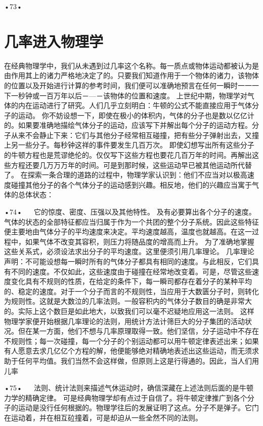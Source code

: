 •73•
  
\section{几率进入物理学}

在经典物理学中，我们从未遇到过几率这个名称。每一质点或物体运动都被认为是由作用其上的诸力严格地决定了的。只要我们知道作用于一个物体的诸力，该物体的位置以及开始进行计算的参考时间，我们便可以准确地预言在任何一瞬时一一一下一秒钟或一百万年以后－—－该物体的位置和速度。
上世纪中期，物理学对气体的内在运动进行了研究。人们几乎立刻明白：牛顿的公式不能直接应用于气体分子的运动。
你不妨设想一下，即使在极小的体积内，气体的分子也是数以亿亿计的。如果要准确地描绘气体分子的运动，应该写下并解出每个分子的运动方程。分子从来不会静止下来：它们与其他分子经常相互碰撞，把有些分子弹射出去，又撞上另一些分子。每秒钟这祥的事件要发生几百万次。
即使幻想写出所有这些分子的牛顿方程也是荒谬绝伦的。仅仅写下这些方程也要花几百万年的时间。再解出这些方程还要几万万万年的时间。可是到那时候，这些运动早已被其他运动所代替了。
在探索一条合理的道路的过程中，物理学家认识到：他们不应当对以极高速度碰撞其他分子的各个气体分子的运动感到兴趣。相反地，他们的兴趣应当寓于气体的总体状态：

•74•
  
它的惊度、密度、压强以及其他特性。
及有必要算出各个分子的速度。气体的状态的全部特征都应当归属于作为一个共团的整个分子系统。因此这些特征便主要地由气体分子的平均速度来决定。平均速度越高，温度也就越高。在这一过程中，如果气体不改变其容积，则压力将随品度的增高而上升。
为了准确地掌握这些关系式，必须设法求出分子的平均速度。这里便须引用几率理论。
几率理论声明：不可能设想每一瞬时所有的气体分子都具有相同的速度。与此相反，它们具有不同的速度。不仅如此，这些速度由于碰撞在经常地改变着。可是，尽管这些速度变化具有不规则的性质，在给定的条件下，每一瞬司都存在着分子的某种平均的、稳定的速度。对于一个分子而言的不规则性，当应用于大数匮分子时，则转化为规则性。这就是大数泣的几率法则。一般容积内的气体分子数目的确是非常大的。实际上这个数巨是如此地大，以致我们可以毫不迟疑地应用这一法则。
这样物理学家便开始根据几率理论的法则，用统计方法计筛巨大的分子集团的活动状况。但在某一方面，他们不想与几率原理取得一致。他们坚信，分子运动中不存在不规则性；每一次碰撞，每一个分子的个别运动都可以用牛顿定律表述出来；如果有人愿意去求几亿亿个方程的解，他便能够绝对精确地表述出这些运动，而无须求助于任何平均值。我们当然不会这样做，但原则上这是行得通的。因此，当人们用儿率

•75•
  
法则、统计法则来描述气休运动时，确信深藏在上述法则后面的是牛顿力学的精确定律。
可是经典物理学却有点过于自信了。将牛顿定律推广到各个分子的运动是没行任何根据的。物理学往后的发展证明了这点。分子不是弹子。它门在运动着，并在相互砬撞着，可是却迫从一些全然不同的法则。

